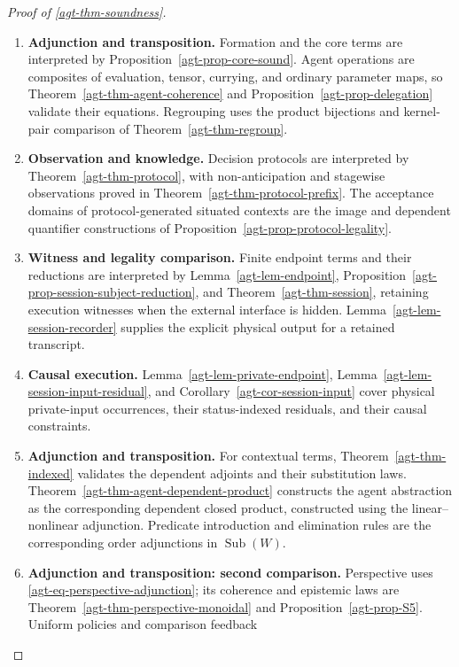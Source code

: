 \documentclass[11pt,a4paper]{article}
\numberwithin{equation}{section}
\theoremstyle{definition}
\theoremstyle{remark}
\theoremstyle{plain}
\providecommand{\Sub}{\mathop{\mathrm{Sub}}}
\begin{document}
\begin{proof}[Proof of \cref{agt-thm-soundness}]
\leavevmode
\begin{enumerate}[label=\textup{(\arabic*)},leftmargin=*,itemsep=4pt,topsep=3pt]
  \item \textbf{Adjunction and transposition.} Formation and the core terms are interpreted by
Proposition~\ref{agt-prop-core-sound}. Agent operations are composites of
evaluation, tensor, currying, and ordinary parameter maps, so
Theorem~\ref{agt-thm-agent-coherence} and
Proposition~\ref{agt-prop-delegation} validate their equations. Regrouping
uses the product bijections and kernel-pair comparison of
Theorem~\ref{agt-thm-regroup}.
  \item \textbf{Observation and knowledge.} Decision protocols are interpreted by
Theorem~\ref{agt-thm-protocol}, with non-anticipation and stagewise
observations proved in Theorem~\ref{agt-thm-protocol-prefix}. The
acceptance domains of protocol-generated situated contexts are the
image and dependent quantifier constructions of
Proposition~\ref{agt-prop-protocol-legality}.
  \item \textbf{Witness and legality comparison.} Finite endpoint terms
and their reductions are interpreted by Lemma~\ref{agt-lem-endpoint},
Proposition~\ref{agt-prop-session-subject-reduction}, and
Theorem~\ref{agt-thm-session}, retaining execution witnesses when the
external interface is hidden. Lemma~\ref{agt-lem-session-recorder} supplies
the explicit physical output for a retained transcript.
  \item \textbf{Causal execution.} Lemma~\ref{agt-lem-private-endpoint},
Lemma~\ref{agt-lem-session-input-residual}, and
Corollary~\ref{agt-cor-session-input} cover physical private-input
occurrences, their status-indexed residuals, and their causal
constraints.
  \item \textbf{Adjunction and transposition.} For contextual terms, Theorem~\ref{agt-thm-indexed} validates the dependent
adjoints and their substitution laws. Theorem~\ref{agt-thm-agent-dependent-product}
constructs the agent abstraction as the corresponding dependent closed
product, constructed using the linear--nonlinear adjunction. Predicate introduction
and elimination rules are the corresponding order adjunctions in $\Sub(W)$.
  \item \textbf{Adjunction and transposition: second comparison.} Perspective
uses \eqref{agt-eq-perspective-adjunction}; its coherence and epistemic
laws are Theorem~\ref{agt-thm-perspective-monoidal} and
Proposition~\ref{agt-prop-S5}. Uniform policies and comparison feedback

\end{enumerate}
\end{proof}
\end{document}
